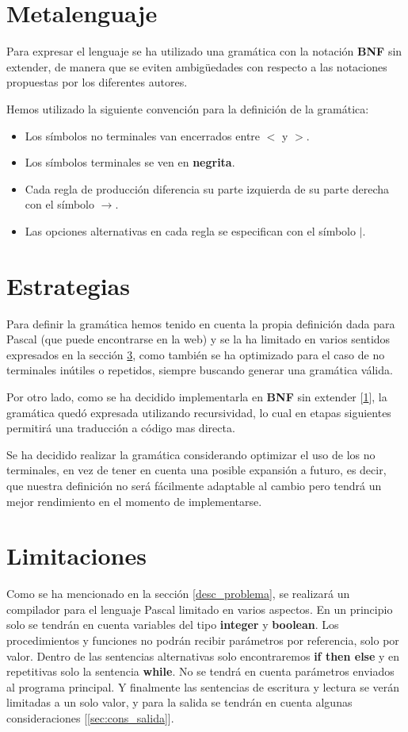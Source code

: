 \section{Metalenguaje}
\label{metalenguaje}
Para expresar el lenguaje se ha utilizado una gramática con la notación \textbf{BNF} sin extender, de manera que se eviten ambigüedades con respecto a las notaciones propuestas por los diferentes autores.

Hemos utilizado la siguiente convención para la definición de la gramática:

\begin{itemize}
\item Los símbolos no terminales van encerrados entre $<$ y $>$.
\item Los símbolos terminales se ven en \textbf{negrita}.
\item Cada regla de producción diferencia su parte izquierda de su parte derecha con el símbolo $\rightarrow$.
\item Las opciones alternativas en cada regla se especifican con el símbolo $|$.
\end{itemize}

\section{Estrategias}
\label{estrategias}
Para definir la gramática hemos tenido en cuenta la propia definición dada para Pascal (que puede encontrarse en la web) y se la ha limitado en varios sentidos expresados en la sección \ref{limitaciones}, como también se ha optimizado para el caso de no terminales inútiles o repetidos, siempre buscando generar una gramática válida.

Por otro lado, como se ha decidido implementarla en \textbf{BNF} sin extender [\ref{metalenguaje}], la gramática quedó expresada utilizando recursividad, lo cual en etapas siguientes permitirá una traducción a código mas directa.

Se ha decidido realizar la gramática considerando optimizar el uso de los no terminales, en vez de tener en cuenta una posible expansión a futuro, es decir, que nuestra definición no será fácilmente adaptable al cambio pero tendrá un mejor rendimiento en el momento de implementarse.

\section{Limitaciones}
\label{limitaciones}
Como se ha mencionado en la sección \ref{desc_problema}, se realizará un compilador para el lenguaje Pascal limitado en varios aspectos. En un principio solo se tendrán en cuenta variables del tipo \textbf{integer} y \textbf{boolean}. Los procedimientos y funciones no podrán recibir parámetros por referencia, solo por valor. Dentro de las sentencias alternativas solo encontraremos \textbf{if then else} y en repetitivas solo la sentencia \textbf{while}. No se tendrá en cuenta parámetros enviados al programa principal. Y finalmente las sentencias de escritura y lectura se verán limitadas a un solo valor, y para la salida se tendrán en cuenta algunas consideraciones [\ref{sec:cons_salida}].

